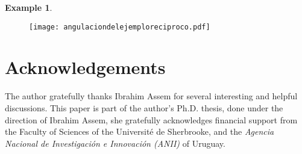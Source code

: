 \documentclass{amsart}
\theoremstyle{plain}
\theoremstyle{definition}
\newtheorem{ejem}[teo]{Example}
\begin{document}
\begin{ejem}
\begin{figure}[H]
\begin{center}
\texttt{[image: angulaciondelejemploreciproco.pdf]}
\end{center}
\end{figure}

 \end{ejem}

\section*{Acknowledgements}
The author gratefully thanks Ibrahim Assem for several interesting and helpful discussions. This paper is part of the  author's Ph.D. thesis, done under the direction of Ibrahim Assem, she gratefully acknowledges financial support from the Faculty of Sciences of the Universit\'e de Sherbrooke, and  the  \emph{Agencia Nacional de Investigaci\'{o}n e Innovaci\'{o}n (ANII)} of Uruguay.




\end{document}
